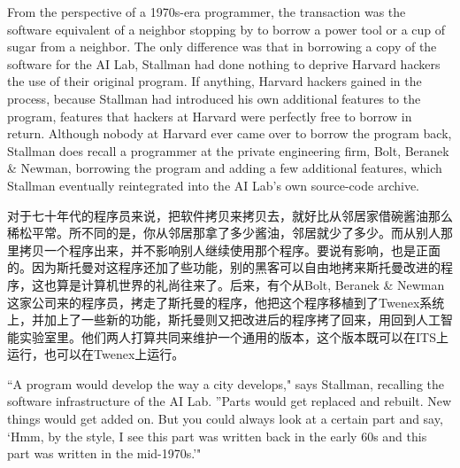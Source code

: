 
\ifdefined\eng
From the perspective of a 1970s-era programmer, the transaction was the software equivalent of a neighbor stopping by to borrow a power tool or a cup of sugar from a neighbor. The only difference was that in borrowing a copy of the software for the AI Lab, Stallman had done nothing to deprive Harvard hackers the use of their original program. If anything, Harvard hackers gained in the process, because Stallman had introduced his own additional features to the program, features that hackers at Harvard were perfectly free to borrow in return. Although nobody at Harvard ever came over to borrow the program back, Stallman does recall a programmer at the private engineering firm, Bolt, Beranek \& Newman, borrowing the program and adding a few additional features, which Stallman eventually reintegrated into the AI Lab's own source-code archive.
\fi

\ifdefined\chs
对于七十年代的程序员来说，把软件拷贝来拷贝去，就好比从邻居家借碗酱油那么稀松平常。所不同的是，你从邻居那拿了多少酱油，邻居就少了多少。而从别人那里拷贝一个程序出来，并不影响别人继续使用那个程序。要说有影响，也是正面的。因为斯托曼对这程序还加了些功能，别的黑客可以自由地拷来斯托曼改进的程序，这也算是计算机世界的礼尚往来了。后来，有个从Bolt, Beranek \& Newman这家公司来的程序员，拷走了斯托曼的程序，他把这个程序移植到了Twenex系统上，并加上了一些新的功能，斯托曼则又把改进后的程序拷了回来，用回到人工智能实验室里。他们两人打算共同来维护一个通用的版本，这个版本既可以在ITS上运行，也可以在Twenex上运行。
\fi

\ifdefined\eng
``A program would develop the way a city develops," says Stallman, recalling the software infrastructure of the AI Lab. ''Parts would get replaced and rebuilt. New things would get added on. But you could always look at a certain part and say, `Hmm, by the style, I see this part was written back in the early 60s and this part was written in the mid-1970s.'\hspace{0.01in}"
\fi

